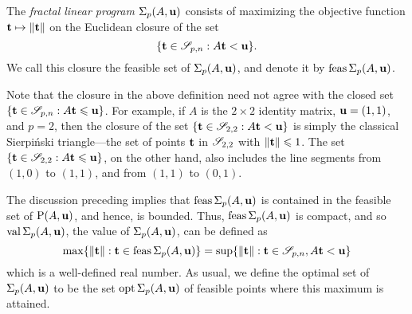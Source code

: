 \documentclass{amsart}
\begin{document}
\begin{definition}
\label{fractal program: D}
The \emph{fractal linear program} $\Sigma_p(A,\mathbf{u})$ consists of maximizing the objective function $\mathbf{t}\mapsto \| \mathbf{t} \|$ on the Euclidean closure of the set \[ \{ \mathbf{t} \in \mathscr{S}_{p,n} : A \mathbf{t} < \mathbf{u} \}.\]  We call this closure the feasible set of $\Sigma_p(A, \mathbf{u})$, and denote it by $\operatorname{feas} \Sigma_p(A, \mathbf{u})$.
\end{definition}

\begin{remark}
   Note that the closure in the above definition need not agree with the closed set $\{ \mathbf{t} \in \mathscr{S}_{p,n} : A \mathbf{t} \leqslant \mathbf{u} \}$.
   For example, if $A$ is the $2\times 2$ identity matrix, $\mathbf{u} = (1,1)$, and $p=2$, then the closure of the set $\{ \mathbf{t} \in \mathscr{S}_{2,2} : A \mathbf{t} < \mathbf{u} \}$ is simply the classical Sierpi\'nski triangle---the set of points $\mathbf{t}$ in $\mathscr{S}_{2,2}$ with $\| \mathbf{t} \| \leqslant 1$. The set $\{ \mathbf{t} \in \mathscr{S}_{2,2} : A \mathbf{t} \leqslant \mathbf{u} \}$, on the other hand, also includes the line segments from $(1,0)$ to $(1,1)$, and from $(1,1)$ to $(0,1)$.
\end{remark}

\begin{remark}  The discussion preceding  implies that $\operatorname{feas} \Sigma_p(A, \mathbf{u})$ is contained in the feasible set of $\mathrm{P}(A, \mathbf{u})$, and hence, is bounded.  Thus, $\operatorname{feas} \Sigma_p(A, \mathbf{u})$ is compact, and so $\operatorname{val} \Sigma_p(A, \mathbf{u})$, the value of $\Sigma_p(A, \mathbf{u})$, can be defined as
   \[ \max \{ \| \mathbf{t} \|: \mathbf{t} \in \operatorname{feas} \Sigma_p(A, \mathbf{u}) \} = \sup \{ \| \mathbf{t} \| : \mathbf{t} \in \mathscr{S}_{p,n}, A \mathbf{t} < \mathbf{u} \} \] which is a well-defined real number.
   As usual, we define the optimal set of $\Sigma_p(A, \mathbf{u})$ to be the set $\operatorname{opt} \Sigma_p(A, \mathbf{u})$ of feasible points where this maximum is attained.
\end{remark}
\end{document}
